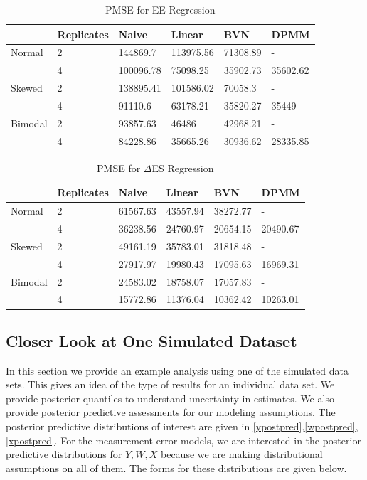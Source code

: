 \documentclass[11pt]{article}\usepackage[]{graphicx}\usepackage[]{color}
\begin{document}
\begin{table}[ht]
\centering
\begin{tabular}{ll|llll}
  \hline
 & Replicates & Naive & Linear & BVN & DPMM \\ 
  \hline
Normal & 2 & 144869.7 & 113975.56 & 71308.89 & - \\ 
   & 4 & 100096.78 & 75098.25 & 35902.73 & 35602.62 \\ 
  Skewed & 2 & 138895.41 & 101586.02 & 70058.3 & - \\ 
   & 4 & 91110.6 & 63178.21 & 35820.27 & 35449 \\ 
  Bimodal & 2 & 93857.63 & 46486 & 42968.21 & - \\ 
   & 4 & 84228.86 & 35665.26 & 30936.62 & 28335.85 \\ 
   \hline
\end{tabular}
\caption{PMSE for EE Regression} 
\label{pmseee}
\end{table}




\begin{table}[ht]
\centering
\begin{tabular}{ll|llll}
  \hline
 & Replicates & Naive & Linear & BVN & DPMM \\ 
  \hline
Normal & 2 & 61567.63 & 43557.94 & 38272.77 & - \\ 
   & 4 & 36238.56 & 24760.97 & 20654.15 & 20490.67 \\ 
  Skewed & 2 & 49161.19 & 35783.01 & 31818.48 & - \\ 
   & 4 & 27917.97 & 19980.43 & 17095.63 & 16969.31 \\ 
  Bimodal & 2 & 24583.02 & 18758.07 & 17057.83 & - \\ 
   & 4 & 15772.86 & 11376.04 & 10362.42 & 10263.01 \\ 
   \hline
\end{tabular}
\caption{PMSE for $\Delta$ES Regression} 
\label{pmsees}
\end{table}


\subsection{Closer Look at One Simulated Dataset}
 
In this section we provide an example analysis using one of the simulated data sets. This gives an idea of the type of results for an individual data set. We provide posterior quantiles to understand uncertainty in estimates. We also provide posterior predictive assessments for our modeling assumptions.  The posterior predictive distributions of interest are given in \eqref{ypostpred},\eqref{wpostpred},\eqref{xpostpred}. For the measurement error models, we are interested in the posterior predictive distributions for $Y,W,X$ because we are making distributional assumptions on all of them. The forms for these distributions are given below.
  
\end{document}

